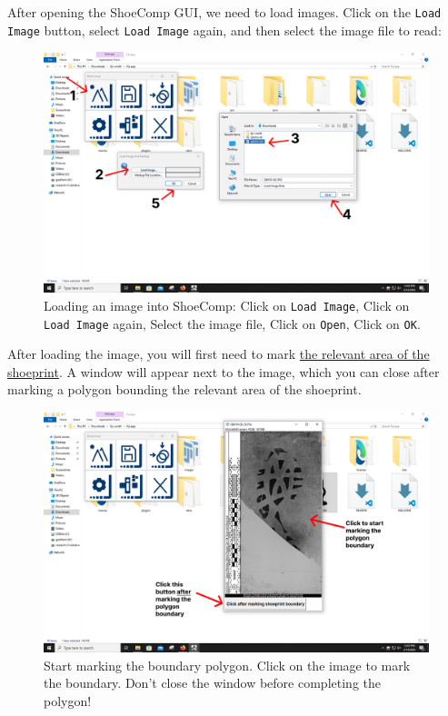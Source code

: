 \documentclass{csafedoc}
\begin{document}
After opening the ShoeComp GUI, we need to load images. Click on the \texttt{Load Image}
button, select \texttt{Load Image} again, and then select the image file to read:

\begin{figure}[H]
	\begin{center}
		\includegraphics[width=0.8\linewidth]{images/step_4a-anno.png}
	\end{center}
	\caption{Loading an image into ShoeComp: Click on \texttt{Load Image}, Click on
		\texttt{Load Image} again, Select the image file, Click on \texttt{Open}, Click on \texttt{OK}.}
	\label{fig:step4a}
\end{figure}

After loading the image, you will first need to mark \underline{the relevant area of the
	shoeprint}. A window will appear next to the image, which you can close after marking a
polygon bounding the relevant area of the shoeprint.

\begin{figure}[H]
	\begin{center}
		\includegraphics[width=0.8\linewidth]{images/step_4b-anno.png}
	\end{center}
	\caption{Start marking the boundary polygon. Click on the image to mark the boundary.
		Don't close the window before completing the polygon!}
	\label{fig:step4b}
\end{figure}
\end{document}
